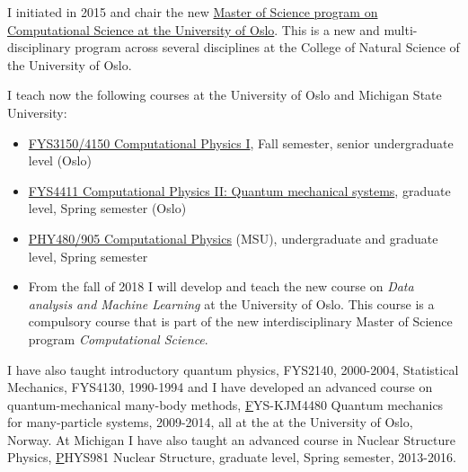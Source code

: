 \documentclass[a4wide,10pt]{article}
\begin{document}
I initiated in 2015 and chair the new \href{{http://www.uio.no/english/studies/programmes/computational-science-master/}}{Master of Science program on Computational Science at the University of Oslo}. This is a new and multi-disciplinary program across several disciplines at the College of Natural Science of the University of Oslo. 

I teach now the following courses at the University of Oslo and Michigan State University:

\begin{itemize}
\item \href{{http://www.uio.no/studier/emner/matnat/fys/FYS3150/}}{FYS3150/4150 Computational Physics I}, Fall semester, senior undergraduate level (Oslo) 

\item \href{{http://www.uio.no/studier/emner/matnat/fys/FYS4411/}}{FYS4411 Computational Physics II: Quantum mechanical systems}, graduate level, Spring semester (Oslo) 

\item \href{{https://github.com/CompPhysics/ComputationalPhysicsMSU}}{PHY480/905 Computational Physics} (MSU), undergraduate and graduate level, Spring semester

\item From the fall of 2018 I will develop and teach the new course on {\em Data analysis and Machine Learning} at the University of Oslo. This course is a compulsory course that is part of the new interdisciplinary Master of Science program {\em Computational Science}. 

\end{itemize}



I have also taught introductory quantum physics, FYS2140, 2000-2004, Statistical Mechanics, FYS4130, 1990-1994 and I have developed an advanced course on quantum-mechanical many-body methods, \href{http://www.uio.no/studier/emner/matnat/fys/FYS-kjm4480/} FYS-KJM4480 Quantum mechanics for many-particle systems, 2009-2014, all at the at the University of Oslo, Norway. At Michigan I have also taught an advanced course in Nuclear Structure Physics, \href{https://github.com/NuclearStructure/PHY981} PHYS981 Nuclear Structure, graduate level, Spring semester, 2013-2016. 
\end{document}
